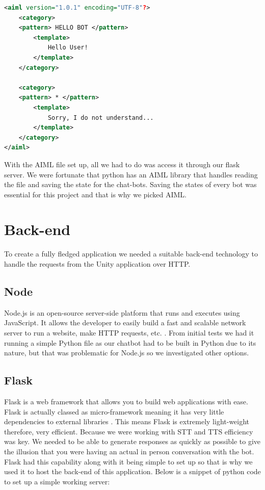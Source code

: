 \begin{lstlisting}[language=XML]
<aiml version="1.0.1" encoding="UTF-8"?>
    <category>
    <pattern> HELLO BOT </pattern>
        <template>
            Hello User!
        </template>
    </category>
    
    <category>
    <pattern> * </pattern>
        <template>
            Sorry, I do not understand...
        </template>
    </category>
</aiml>

\end{lstlisting}

With the AIML file set up, all we had to do was access it through our flask server. We were fortunate that python has an AIML library that handles reading the file and saving the state for the chat-bots. Saving the states of every bot was essential for this project and that is why we picked AIML.

\section{Back-end}
To create a fully fledged application we needed a suitable back-end technology to handle the requests from the Unity application over HTTP.

\subsection{Node}
Node.js is an open-source server-side platform that runs and executes using JavaScript. It allows the developer to easily build a fast and scalable network server to run a website, make HTTP requests, etc. \cite{node}. From initial tests we had it running a simple Python file as our chatbot had to be built in Python due to its nature, but that was problematic for Node.js so we investigated other options.

\subsection{Flask}
Flask is a web framework that allows you to build web applications with ease. Flask is actually classed as micro-framework meaning it has very little dependencies to external libraries \cite{flask}. This means Flask is extremely light-weight therefore, very efficient. Because we were working with STT and TTS efficiency was key. We needed to be able to generate responses as quickly as possible to give the illusion that you were having an actual in person conversation with the bot. Flask had this capability along with it being simple to set up so that is why we used it to host the back-end of this application. Below is a snippet of python code to set up a simple working server:

